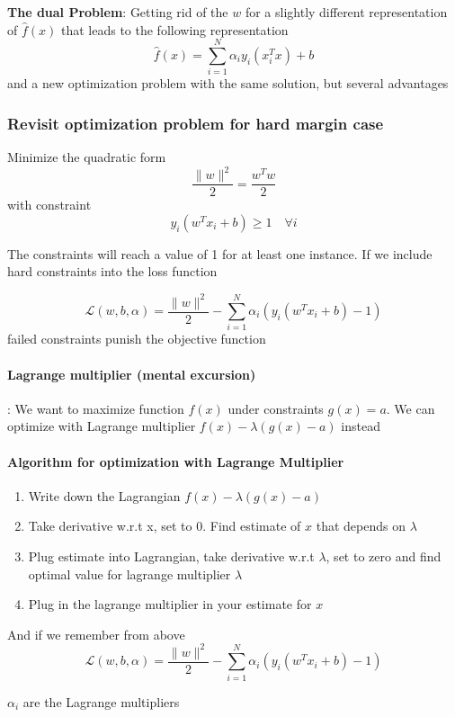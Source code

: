 \documentclass{article}
\begin{document}
\textbf{The dual Problem}: Getting rid of the $w$ for a slightly different representation of $\hat{f}(x)$ that leads to the following representation
\[\hat{f}(x) = \sum_{i=1}^N \alpha_i y_i(x_i^Tx) + b\]
and a new optimization problem with the same solution, but several advantages


\subsubsection{Revisit optimization problem for hard margin case}

Minimize the quadratic form
\[\frac{\|w\|^2}{2} = \frac{w^T w}{2}\]
with constraint
\[y_i (w^Tx_i + b) \geq 1 \quad \forall i\]

The constraints will reach a value of 1 for at least one instance. If we include hard constraints into the loss function

\[\mathcal{L}(w,b,\alpha) = \frac{\|w\|^2}{2} - \sum_{i=1}^N\alpha_i(y_i(w^Tx_i + b) - 1)\]
failed constraints punish the objective function

\paragraph{Lagrange multiplier (mental excursion)}: We want to maximize function $f(x)$ under constraints $g(x) = a$. We can optimize with Lagrange multiplier $f(x) - \lambda(g(x) -a)$ instead

\paragraph{Algorithm for optimization with Lagrange Multiplier}

\begin{enumerate}
  \item Write down the Lagrangian $f(x) - \lambda (g(x) -a )$
  \item Take derivative w.r.t x, set to 0. Find estimate of $x$ that depends on $\lambda$
  \item Plug estimate into Lagrangian, take derivative w.r.t $\lambda$, set to zero and find optimal value for lagrange multiplier $\lambda$
  \item Plug in the lagrange multiplier in your estimate for $x$
\end{enumerate}

And if we remember from above
\[\mathcal{L}(w,b,\alpha) = \frac{\|w\|^2}{2} - \sum_{i=1}^N\alpha_i(y_i(w^Tx_i + b) - 1)\]

$\alpha_i$ are the Lagrange multipliers
\end{document}
